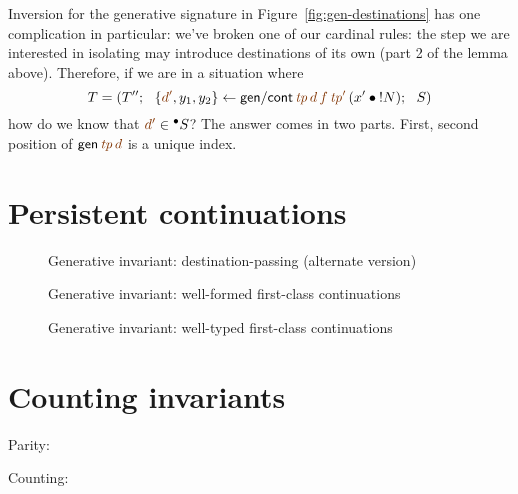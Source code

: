 Inversion for the generative signature in
Figure~\ref{fig:gen-destinations} has one complication in particular: 
we've broken one of our cardinal rules: the step we are interested in 
isolating may introduce destinations of its own (part 2 of the lemma above).
Therefore, if we are in a situation where 
\[
T = \left(T''; ~~ \trstep{\lf{d'},y_1,y_2}
              {{\sf gen/cont}\,\lf{\it tp}\,\lf{d}\,\lf{f}\,\lf{{\it tp}'}\,
                (\tfuser{x'}{\tbangr{N}})}; ~~ S\right)
\]
how do we know that $\lf{d'} \in {^\bullet}S$? The answer comes in two parts.
First, second position of 
${\sf gen}\,\lf{\it tp}\,\lf{d}$ is a unique index. 

\section{Persistent continuations}
\label{sec:gen-letcc}

\begin{figure}[tp]
\caption{Generative invariant: destination-passing (alternate version)}
\label{fig:gen-destinations2} 
\end{figure}


\begin{figure}[tp]
\caption{Generative invariant: well-formed first-class continuations}
\label{fig:gen-letcc} 
\end{figure}

\begin{figure}[tp]
\caption{Generative invariant: well-typed first-class continuations}
\label{fig:gen-letcc} 
\end{figure}


\section{Counting invariants}
\label{sec:gen-count}

Parity:

\bigskip
\noindent
Counting:





\label{sec:pointer-inequality}
